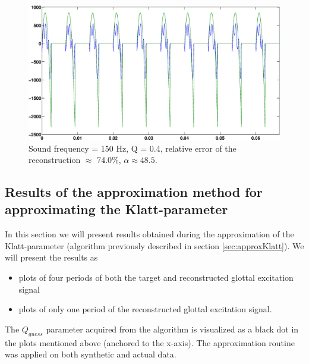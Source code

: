 \documentclass[12pt,a4]{article}
\begin{document}
\begin{figure}[H]
\begin{center}
\includegraphics[scale=.3]{img/morozov_no-crime_error-005_Qrand-0[Pres-V2].eps}
\end{center}
\caption{Sound frequency = 150 Hz, Q = 0.4, relative error of the reconstruction $\approx$ 74.0\%, $\alpha \approx 48.5$.}
\label{fig:tik-5}
\end{figure}

\subsection{Results of the approximation method for \\approximating the Klatt-parameter}
\label{sec:KlattApprox}

In this section we will present results obtained during the approximation of the Klatt-parameter (algorithm previously described in section \ref{sec:approxKlatt}). We will present the results as
\begin{itemize}
 \item plots of four periods of both the target and reconstructed glottal excitation signal
 \item plots of only one period of the reconstructed glottal excitation signal.
\end{itemize}
The $Q_{guess}$ parameter acquired from the algorithm is visualized as a black dot in the plots mentioned above (anchored to the x-axis). The approximation routine was applied on both synthetic and actual data. \newpage
\end{document}
